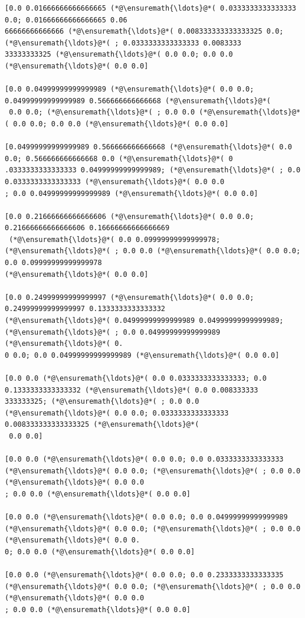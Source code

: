 \documentclass[12pt,a4paper]{article}
\begin{document}
\begin{lstlisting}
[0.0 0.01666666666666665 (*@\ensuremath{\ldots}@*( 0.0333333333333333 0.0; 0.01666666666666665 0.06
66666666666666 (*@\ensuremath{\ldots}@*( 0.008333333333333325 0.0; (*@\ensuremath{\ldots}@*( ; 0.0333333333333333 0.0083333
33333333325 (*@\ensuremath{\ldots}@*( 0.0 0.0; 0.0 0.0 (*@\ensuremath{\ldots}@*( 0.0 0.0]

[0.0 0.04999999999999989 (*@\ensuremath{\ldots}@*( 0.0 0.0; 0.04999999999999989 0.566666666666668 (*@\ensuremath{\ldots}@*(
 0.0 0.0; (*@\ensuremath{\ldots}@*( ; 0.0 0.0 (*@\ensuremath{\ldots}@*( 0.0 0.0; 0.0 0.0 (*@\ensuremath{\ldots}@*( 0.0 0.0]

[0.04999999999999989 0.566666666666668 (*@\ensuremath{\ldots}@*( 0.0 0.0; 0.566666666666668 0.0 (*@\ensuremath{\ldots}@*( 0
.0333333333333333 0.04999999999999989; (*@\ensuremath{\ldots}@*( ; 0.0 0.0333333333333333 (*@\ensuremath{\ldots}@*( 0.0 0.0
; 0.0 0.04999999999999989 (*@\ensuremath{\ldots}@*( 0.0 0.0]

[0.0 0.21666666666666606 (*@\ensuremath{\ldots}@*( 0.0 0.0; 0.21666666666666606 0.16666666666666669
 (*@\ensuremath{\ldots}@*( 0.0 0.09999999999999978; (*@\ensuremath{\ldots}@*( ; 0.0 0.0 (*@\ensuremath{\ldots}@*( 0.0 0.0; 0.0 0.09999999999999978 
(*@\ensuremath{\ldots}@*( 0.0 0.0]

[0.0 0.24999999999999997 (*@\ensuremath{\ldots}@*( 0.0 0.0; 0.24999999999999997 0.1333333333333332 
(*@\ensuremath{\ldots}@*( 0.04999999999999989 0.04999999999999989; (*@\ensuremath{\ldots}@*( ; 0.0 0.04999999999999989 (*@\ensuremath{\ldots}@*( 0.
0 0.0; 0.0 0.04999999999999989 (*@\ensuremath{\ldots}@*( 0.0 0.0]

[0.0 0.0 (*@\ensuremath{\ldots}@*( 0.0 0.0333333333333333; 0.0 0.1333333333333332 (*@\ensuremath{\ldots}@*( 0.0 0.008333333
333333325; (*@\ensuremath{\ldots}@*( ; 0.0 0.0 (*@\ensuremath{\ldots}@*( 0.0 0.0; 0.0333333333333333 0.008333333333333325 (*@\ensuremath{\ldots}@*(
 0.0 0.0]

[0.0 0.0 (*@\ensuremath{\ldots}@*( 0.0 0.0; 0.0 0.0333333333333333 (*@\ensuremath{\ldots}@*( 0.0 0.0; (*@\ensuremath{\ldots}@*( ; 0.0 0.0 (*@\ensuremath{\ldots}@*( 0.0 0.0
; 0.0 0.0 (*@\ensuremath{\ldots}@*( 0.0 0.0]

[0.0 0.0 (*@\ensuremath{\ldots}@*( 0.0 0.0; 0.0 0.04999999999999989 (*@\ensuremath{\ldots}@*( 0.0 0.0; (*@\ensuremath{\ldots}@*( ; 0.0 0.0 (*@\ensuremath{\ldots}@*( 0.0 0.
0; 0.0 0.0 (*@\ensuremath{\ldots}@*( 0.0 0.0]

[0.0 0.0 (*@\ensuremath{\ldots}@*( 0.0 0.0; 0.0 0.2333333333333335 (*@\ensuremath{\ldots}@*( 0.0 0.0; (*@\ensuremath{\ldots}@*( ; 0.0 0.0 (*@\ensuremath{\ldots}@*( 0.0 0.0
; 0.0 0.0 (*@\ensuremath{\ldots}@*( 0.0 0.0]


\end{lstlisting}
\end{document}

